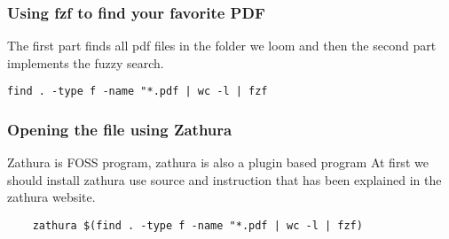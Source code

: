 \documentclass[30px]{article}
\begin{document}
\subsubsection{Using fzf to find your favorite PDF}
The first part finds all pdf files in the folder we loom and then the second part implements the fuzzy search.
\begin{verbatim}
find . -type f -name "*.pdf | wc -l | fzf
\end{verbatim}
\subsubsection{Opening the file using Zathura}
Zathura is FOSS program, zathura is also a plugin based program
\newline At first we should install zathura use source and instruction that has been explained in the zathura website.
\begin{verbatim}
    zathura $(find . -type f -name "*.pdf | wc -l | fzf)
\end{verbatim}
\end{document}
